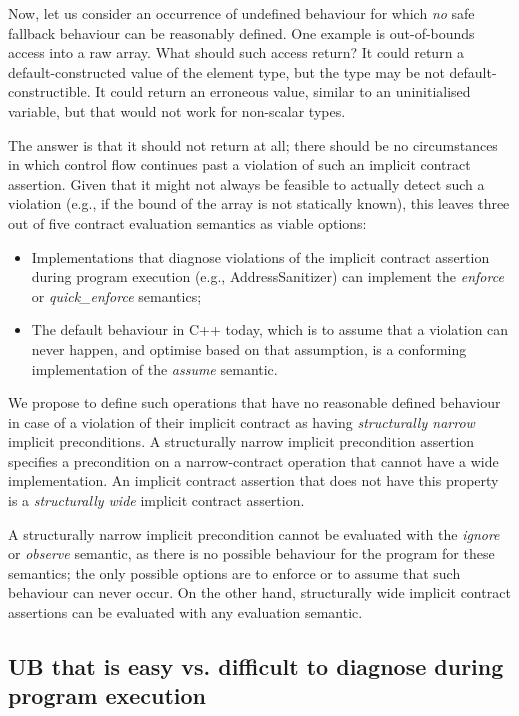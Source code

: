 Now, let us consider an occurrence of undefined behaviour for which \emph{no} safe fallback behaviour can be reasonably defined. One example is out-of-bounds access into a raw array. What should such access return? It could return a default-constructed value of the element type, but the type may be not default-constructible. It could return an erroneous value, similar to an uninitialised variable, but that would not work for non-scalar types.

The answer is that it should not return at all; there should be no circumstances in which control flow continues past a violation of such an implicit contract assertion. Given that it might not always be feasible to actually detect such a violation (e.g., if the bound of the array is not statically known), this leaves three out of five contract evaluation semantics as viable options:
\begin{itemize}
\item Implementations that diagnose violations of the implicit contract assertion during program execution (e.g., AddressSanitizer) can implement the \emph{enforce} or \emph{quick_enforce} semantics;
\item The default behaviour in C++ today, which is to assume that a violation can never happen, and optimise based on that assumption, is a conforming implementation of the \emph{assume} semantic.
\end{itemize}
We propose to define such operations that have no reasonable defined behaviour in case of a violation of their implicit contract  as having \emph{structurally narrow} implicit preconditions. A structurally narrow implicit precondition assertion specifies a precondition on a narrow-contract operation that cannot have a wide implementation. An implicit contract assertion that does not have this property is a \emph{structurally wide} implicit contract assertion.

A structurally narrow implicit precondition cannot be evaluated with the \emph{ignore} or \emph{observe} semantic, as there is no possible behaviour for the program for these semantics; the only possible options are to enforce or to assume that such behaviour can never occur. On the other hand, structurally wide implicit contract assertions can be evaluated with any evaluation semantic.

\subsection{UB that is easy vs. difficult to diagnose during program execution}
\label{easy}

